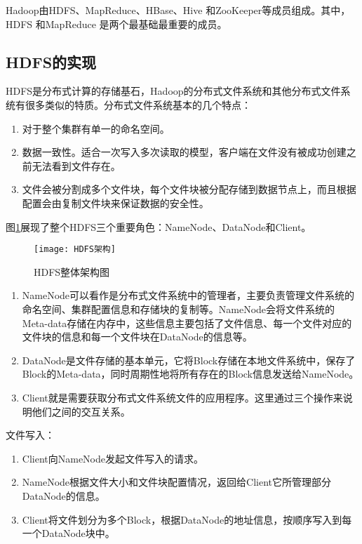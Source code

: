 Hadoop由HDFS、MapReduce、HBase、Hive 和ZooKeeper等成员组成。其中，HDFS 和MapReduce 是两个最基础最重要的成员。

\subsection[HDFS的实现]{HDFS的实现\cite{site:hdfs}}
HDFS是分布式计算的存储基石，Hadoop的分布式文件系统和其他分布式文件系统有很多类似的特质。分布式文件系统基本的几个特点：

\begin{enumerate}
\item 对于整个集群有单一的命名空间。
\item 数据一致性。适合一次写入多次读取的模型，客户端在文件没有被成功创建之前无法看到文件存在。
\item 文件会被分割成多个文件块，每个文件块被分配存储到数据节点上，而且根据配置会由复制文件块来保证数据的安全性。
\end{enumerate}

图\ref{fig:HDFS架构}展现了整个HDFS三个重要角色：NameNode、DataNode和Client。

\begin{figure}[h]
 \centering
 \texttt{[image: HDFS架构]}
 \caption{HDFS整体架构图}
 \label{fig:HDFS架构}
\end{figure}

\begin{enumerate}
\item NameNode可以看作是分布式文件系统中的管理者，主要负责管理文件系统的命名空间、集群配置信息和存储块的复制等。NameNode会将文件系统的Meta-data存储在内存中，这些信息主要包括了文件信息、每一个文件对应的文件块的信息和每一个文件块在DataNode的信息等。
\item DataNode是文件存储的基本单元，它将Block存储在本地文件系统中，保存了Block的Meta-data，同时周期性地将所有存在的Block信息发送给NameNode。
\item Client就是需要获取分布式文件系统文件的应用程序。这里通过三个操作来说明他们之间的交互关系。
\end{enumerate}

文件写入：

\begin{enumerate}
\item Client向NameNode发起文件写入的请求。
\item NameNode根据文件大小和文件块配置情况，返回给Client它所管理部分DataNode的信息。
\item Client将文件划分为多个Block，根据DataNode的地址信息，按顺序写入到每一个DataNode块中。
\end{enumerate}


